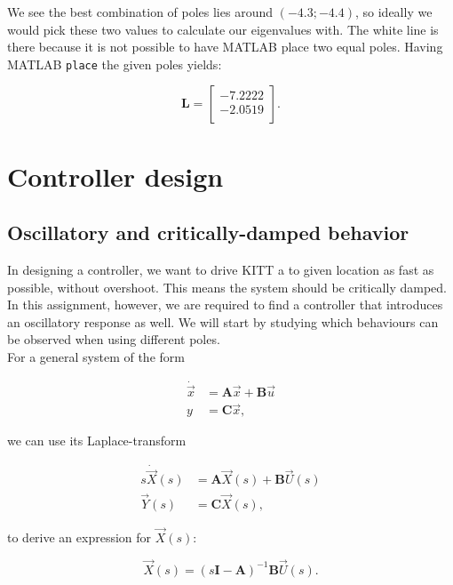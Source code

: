\documentclass[11pt,titlepage]{report}
\begin{document}
We see the best combination of poles lies around $(-4.3; -4.4)$, so ideally we would pick these two values to calculate our eigenvalues with. The white line is there because it is not possible to have MATLAB place two equal poles. Having MATLAB \texttt{place} the given poles yields:

\begin{equation}
	\mathbf{L} =
		\begin{bmatrix}
			-7.2222 \\
			-2.0519 \\
		\end{bmatrix}.
\end{equation}

\section{Controller design}
\subsection{Oscillatory and critically-damped behavior}
In designing a controller, we want to drive KITT a to given location as fast as possible, without overshoot. This means the system should be critically damped. In this assignment, however, we are required to find a controller that introduces an oscillatory response as well. We will start by studying which behaviours can be observed when using different poles.
\\
For a general system of the form

\begin{equation*}
	\begin{split}
		\dot{\vec{x}} &= \mathbf{A}\vec{x} + \mathbf{B}\vec{u} \\
		y &= \mathbf{C}\vec{x},
	\end{split}
\end{equation*}

we can use its Laplace-transform

\begin{equation}
	\begin{split}
		s\dot{\vec{X}}(s) &= \mathbf{A}\vec{X}(s) + \mathbf{B}\vec{U}(s) \\
		\vec{Y}(s) &= \mathbf{C}\vec{X}(s),
	\end{split}
	\label{eq:ass2-system-laplace}
\end{equation}

to derive an expression for $\vec{X}(s)$:

\begin{equation}
	\vec{X}(s) = (s\mathbf{I} - \mathbf{A})^{-1}\mathbf{B}\vec{U}(s).
	\label{eq:ass2-Xs}
\end{equation}
\end{document}

